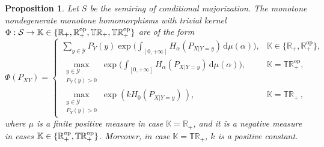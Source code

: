 \documentclass[aps,pra,11pt,onecolumn,nofootinbib,tightenlines]{revtex4-2}
\newtheorem{proposition}[theorem]{Proposition}
\theoremstyle{definition}
\newcommand{\R}{\mathbb{R}}
\newcommand{\T}{\mathbb{T}}
\newcommand{\mc}[1]{\mathcal{#1}}
\newcommand{\mb}[1]{\mathbb{#1}}
\begin{document}
\begin{proposition}
\label{prop: monotone homomorphisms}
Let \( S\) be the semiring of conditional majorization. The monotone nondegenerate monotone homomorphisms with trivial kernel $\Phi:\mc S\to\mb K\in\{\R_+,\R_+^{\rm op},\T\R_+,\T\R_+^{\rm op}\}$ are of the form
\begin{equation}
\label{eq:FinalForm}
\Phi(P_{XY}) =
\begin{cases}
\displaystyle \sum_{y \in \mathcal{Y}} P_Y(y) \exp\Bigg(\int_{[0,+\infty]} H_\alpha(P_{X|Y=y}) \, \mathrm{d}\mu(\alpha) \Bigg), & \mb K\in\{\mathbb{R}_+,\mathbb{R}_+^{\mathrm{op}}\}, \\
\displaystyle \max \limits_{\substack{y \in \mathcal{Y} \\ P_Y( y) > 0}} \exp\Bigg(\int_{[0,+\infty]} H_\alpha(P_{X|Y=y}) \, \mathrm{d}\mu(\alpha) \Bigg), &\mb K=\mathbb{TR}_+^{\mathrm{op}}, \\
\displaystyle \max \limits_{\substack{y \in \mathcal{Y} \\ P_Y( y) > 0}} \exp\left(k H_0(P_{X|Y=y}) \, \right), &\mb K=\mathbb{TR}_+ \,,
\end{cases}
\end{equation}
where $\mu$ is a finite positive measure in case $\mb K=\mathbb{R}_+$, and it is a negative measure in cases $\mb K\in\{\mathbb{R}_+^{\mathrm{op}},\T\R_+^{\rm op}\}$. Moreover, in case $\mb K=\mathbb{TR}_+$,  $k$ is a positive constant.
\end{proposition}
\end{document}
